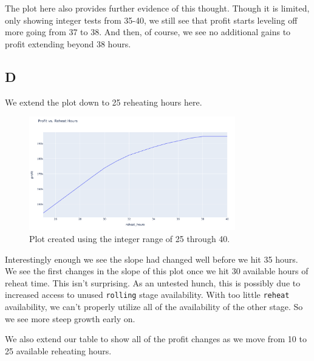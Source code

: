 The plot here also provides further evidence of this thought. Though it is limited, only showing integer tests from 35-40, we still see that profit starts leveling off more going from 37 to 38. And then, of course, we see no additional gains to profit extending beyond 38 hours. 

\pagebreak

\subsection*{D}

We extend the plot down to 25 reheating hours here.

\begin{figure}[htbp]
    \centering
    \includegraphics[width=0.8\textwidth]{../images/profit-vs-reheat-2.png}
    \caption{Plot created using the integer range of 25 through 40.}
\end{figure}

Interestingly enough we see the slope had changed well before we hit 35 hours. We see the first changes in the slope of this plot once we hit 30 available hours of reheat time. This isn't surprising. As an untested hunch, this is possibly due to increased access to unused \texttt{rolling} stage availability. With too little \texttt{reheat} availability, we can't properly utilize all of the availability of the other stage. So we see more steep growth early on.

We also extend our table to show all of the profit changes as we move from 10 to 25 available reheating hours.

